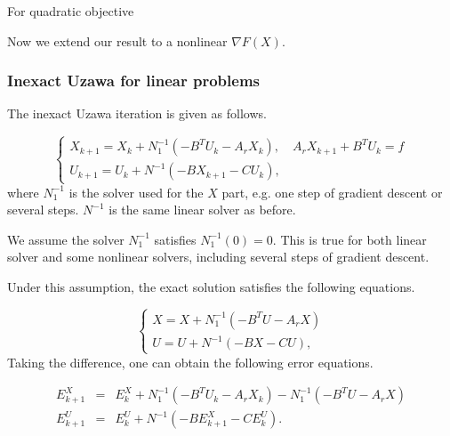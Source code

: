 \begin{itemize}
\begin{theorem}
For quadratic objective 
\end{theorem}

Now we extend our result to a nonlinear $\nabla F(X)$. 

\subsubsection{Inexact Uzawa for linear problems}


The inexact Uzawa iteration is given as follows. 

\begin{equation}
    \begin{cases}
     X_{k+1} = X_k + N_1^{-1}(-B^T U_k - A_r X_k), \quad A_r X_{k+1} +B^T U_k = f \\
     U_{k+1} = U_k + N^{-1} \left( - B X_{k+1} - C U_k\right),
    \end{cases}
\end{equation}
where $N_1^{-1}$ is the solver used for the $X$ part, e.g. one step of gradient descent or several steps. $N^{-1}$ is the same linear solver as before. 

We assume the solver $N_1^{-1}$ satisfies  $N_1^{-1}(0) = 0$. This is true for both linear solver and some nonlinear solvers, including several steps of gradient descent.


Under this assumption, the exact solution satisfies the following equations. 

\begin{equation}
    \begin{cases}
     X = X + N_1^{-1}(-B^T U - A_r X)\\
     U = U + N^{-1} \left( - B X - C U\right),
    \end{cases}
\end{equation}
Taking the difference, one can obtain the following error equations. 

\begin{eqnarray}
 E^X_{k+1} & = & E^X_{k} + N_1^{-1} (-B^T U_k - A_r X_k) - N_1^{-1} (-B^T U - A_r X) \\
E_{k+1}^U &=& E_{k}^U + N^{-1} (- B E^X_{k+1} - C E^U_k).
\end{eqnarray}


\end{itemize}
